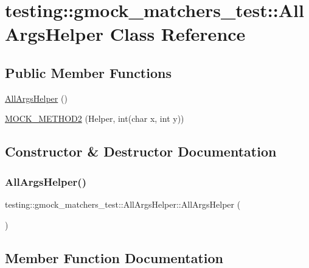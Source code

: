 \hypertarget{classtesting_1_1gmock__matchers__test_1_1AllArgsHelper}{}\section{testing\+::gmock\+\_\+matchers\+\_\+test\+::All\+Args\+Helper Class Reference}
\label{classtesting_1_1gmock__matchers__test_1_1AllArgsHelper}
\subsection*{Public Member Functions}
\begin{DoxyCompactItemize}
\item 
\mbox{\hyperlink{classtesting_1_1gmock__matchers__test_1_1AllArgsHelper_afffee92e50b5545e5b4be8c989ff63ab}{All\+Args\+Helper}} ()
\item 
\mbox{\hyperlink{classtesting_1_1gmock__matchers__test_1_1AllArgsHelper_a571b9c1e5ab4e891085060e73c94be32}{M\+O\+C\+K\+\_\+\+M\+E\+T\+H\+O\+D2}} (Helper, int(char x, int y))
\end{DoxyCompactItemize}


\subsection{Constructor \& Destructor Documentation}
\mbox{\label{classtesting_1_1gmock__matchers__test_1_1AllArgsHelper_afffee92e50b5545e5b4be8c989ff63ab}} 
\subsubsection{\texorpdfstring{AllArgsHelper()}{AllArgsHelper()}}
{\footnotesize\ttfamily testing\+::gmock\+\_\+matchers\+\_\+test\+::\+All\+Args\+Helper\+::\+All\+Args\+Helper (\begin{DoxyParamCaption}{ }\end{DoxyParamCaption})\hspace{0.3cm}{\ttfamily [inline]}}



\subsection{Member Function Documentation}
\mbox{\label{classtesting_1_1gmock__matchers__test_1_1AllArgsHelper_a571b9c1e5ab4e891085060e73c94be32}} 
